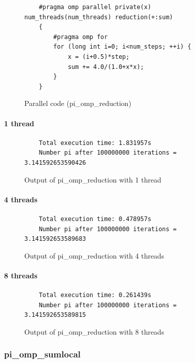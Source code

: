 \documentclass[12pt, a4paper]{article}
\begin{document}
\begin{figure}[H]
	\begin{lstlisting}
	#pragma omp parallel private(x) num_threads(num_threads) reduction(+:sum)
    {
        #pragma omp for 
        for (long int i=0; i<num_steps; ++i) {
            x = (i+0.5)*step;
	    	sum += 4.0/(1.0+x*x);
        }
    }

	\end{lstlisting}
	
	\caption{Parallel code (pi\_omp\_reduction)}
\end{figure}

\paragraph{1 thread}

\begin{figure}[H]
	\begin{lstlisting}
	Total execution time: 1.831957s
	Number pi after 100000000 iterations = 3.141592653590426		
	\end{lstlisting}
	\caption{Output of pi\_omp\_reduction with 1 thread}
\end{figure}

\paragraph{4 threads}

\begin{figure}[H]
	\begin{lstlisting}
	Total execution time: 0.478957s
	Number pi after 100000000 iterations = 3.141592653589683			
	\end{lstlisting}
	\caption{Output of pi\_omp\_reduction with 4 threads}
\end{figure}

\paragraph{8 threads}

\begin{figure}[H]
	\begin{lstlisting}
	Total execution time: 0.261439s
	Number pi after 100000000 iterations = 3.141592653589815
	\end{lstlisting}
	\caption{Output of pi\_omp\_reduction with 8 threads}
\end{figure}

\subsubsection{pi\_omp\_sumlocal}
\end{document}
